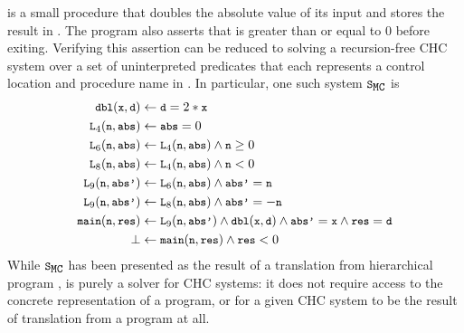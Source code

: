 \begin{figure}[t]
  \centering
  \begin{floatrow}[2]
    {  }
      {}
  \end{floatrow}
\end{figure}
%
 is a small procedure that doubles the absolute value of
its input and stores the result in .
The program also asserts that  is greater than or equal to $0$
before exiting.
Verifying this assertion can be reduced to solving a recursion-free
CHC system over a set of uninterpreted predicates that each represents
a control location and procedure name in .
%
In particular, one such system $\mcchc$ is
%
\begin{align}
\label{chc}
\cc{dbl}(\cc{x}, \cc{d}) &\gets \cc{d} = 2 * \cc{x} \\
  \cc{L}_4(\cc{n}, \cc{abs}) &\gets  \cc{abs} = 0 \\
  \cc{L}_6(\cc{n}, \cc{abs}) &\gets \cc{L}_4(\cc{n}, \cc{abs}) \land \cc{n} \ge 0 \\
  \cc{L}_8(\cc{n}, \cc{abs}) &\gets \cc{L}_4(\cc{n}, \cc{abs}) \land \cc{n} < 0 \\
  \cc{L}_9(\cc{n}, \cc{abs'}) &\gets \cc{L}_6(\cc{n},\cc{abs}) \land \cc{abs'} = \cc{n} \\
   \cc{L}_9(\cc{n}, \cc{abs'}) &\gets \cc{L}_8(\cc{n},\cc{abs}) \land \cc{abs'} = -\cc{n} \\
   \cc{main}(\cc{n},\cc{res}) &\gets \cc{L}_9(\cc{n}, \cc{abs'}) \land
                                     \cc{dbl}(\cc{x}, \cc{d})
    \land \cc{abs'} = \cc{x} \land \cc{res} = \cc{d} \\
    \bot &\gets \cc{main}(\cc{n}, \cc{res}) \land \cc{res} < 0 
\end{align}
%
While $\mcchc$ has been presented as the result
of a translation from hierarchical program , \sys is
purely a solver for CHC systems: it does not require access to the
concrete representation of a program, or for a given CHC system to be
the result of translation from a program at all.

